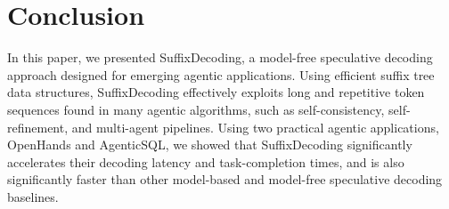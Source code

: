 \section{Conclusion}

In this paper, we presented SuffixDecoding, a model-free speculative decoding approach designed for emerging agentic applications. Using efficient suffix tree data structures, SuffixDecoding effectively exploits long and repetitive token sequences found in many agentic algorithms, such as self-consistency, self-refinement, and multi-agent pipelines. Using two practical agentic applications, OpenHands and AgenticSQL, we showed that SuffixDecoding significantly accelerates their decoding latency and task-completion times, and is also significantly faster than other model-based and model-free speculative decoding baselines.